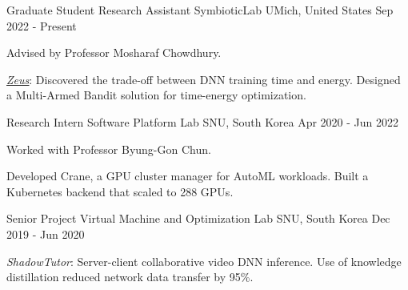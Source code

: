 

\begin{cventries}

  \cventry
    {Graduate Student Research Assistant} %
    {SymbioticLab} %
    {UMich, United States} %
    {Sep 2022 - Present} %
    {
      \begin{cvitems} %
        \item {Advised by Professor Mosharaf Chowdhury.}
        \item {\href{https://ml.energy/zeus}{\underline{\textit{Zeus}}}: Discovered the trade-off between DNN training time and energy. Designed a Multi-Armed Bandit solution for time-energy optimization.}
      \end{cvitems}
    }
    
  \cventry
    {Research Intern} %
    {Software Platform Lab} %
    {SNU, South Korea} %
    {Apr 2020 - Jun 2022} %
    {
      \begin{cvitems} %
        \item {Worked with Professor Byung-Gon Chun.}
        \item {Developed Crane, a GPU cluster manager for AutoML workloads. Built a Kubernetes backend that scaled to 288 GPUs.}
      \end{cvitems}
    }
    
  \cventry
    {Senior Project} %
    {Virtual Machine and Optimization Lab} %
    {SNU, South Korea} %
    {Dec 2019 - Jun 2020} %
    {
      \begin{cvitems} %
        \item {\textit{ShadowTutor}: Server-client collaborative video DNN inference. Use of knowledge distillation reduced network data transfer by 95\%.}
      \end{cvitems}
    }
    

\end{cventries}
